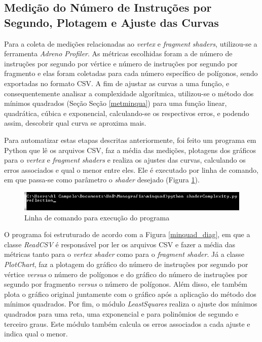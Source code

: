 \subsection{Medição do Número de Instruções por Segundo, Plotagem e Ajuste das Curvas}

	Para a coleta de medições relacionadas ao \textit{vertex} e \textit{fragment} \textit{shaders}, utilizou-se a ferramenta \textit{Adreno Profiler}. As métricas escolhidas foram a de número de instruções por segundo por vértice e número de instruções por segundo por fragmento e elas foram coletadas para cada número específico de polígonos, sendo exportadas no formato CSV. 	A fim de ajustar as curvas a uma função, e consequentemente analisar a complexidade algorítmica, utilizou-se o método dos mínimos quadrados (Seção Seção \ref{metminqua}) para uma função linear, quadrática, cúbica e exponencial, calculando-se os respectivos erros, e podendo assim, descobrir qual curva se aproxima mais. 

	 Para automatizar estas etapas descritas anteriormente, foi feito um programa em Python que lê os arquivos CSV, faz a média das medições, plotagens dos gráficos para o \textit{vertex} e \textit{fragment} \textit{shaders} e realiza os ajustes das curvas, calculando os erros associados e qual o menor entre eles. Ele é executado por linha de comando, em que passa-se como parâmetro o \textit{shader} desejado (Figura \ref{linhacomando}).

	\begin{figure}[ht]
	\centering
		\includegraphics[keepaspectratio=true,scale=0.8]{figuras/linhacomando.jpg}
	\caption{Linha de comando para execução do programa}
	\label{linhacomando}
	\end{figure}


	O programa foi estruturado de acordo com a Figura \ref{minquad_diag}, em que a classe \textit{ReadCSV} é responsável por ler os arquivos CSV e fazer a média das métricas tanto para o \textit{vertex shader} como para o \textit{fragment shader}. Já a classe \textit{PlotChart}, faz a plotagem do gráfico do número de instruções por segundo por vértice \textit{versus} o número de polígonos e do gráfico do número de instruções por segundo por fragmento \textit{versus} o número de polígonos. Além disso, ele também plota o gráfico original juntamente com o gráfico após a aplicação do método dos mínimos quadrados. Por fim, o módulo \textit{LeastSquares} realiza o ajuste dos mínimos quadrados para uma reta, uma exponencial e para polinômios de segundo e terceiro graus. Este módulo também calcula os erros associados a cada ajuste e indica qual o menor. 

